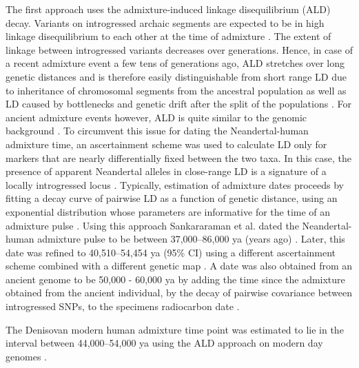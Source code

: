 \documentclass[]{article}
\begin{document}
The first approach uses the admixture-induced linkage disequilibrium (ALD) decay. Variants on introgressed archaic segments are expected to be in high linkage disequilibrium to each other at the time of admixture \citep{chakraborty_admixture_1988,stephens_mapping_1994,wall_detecting_2000}. The extent of linkage between introgressed variants decreases over generations. Hence, in case of a recent admixture event a few tens of generations ago, ALD stretches  over long genetic distances
\citep{patterson_methods_2004} and is therefore easily distinguishable from short range LD due to inheritance of chromosomal segments from the ancestral population as well as LD caused by bottlenecks and genetic drift after the split of the populations \citep{moorjani_history_2011,sankararaman_date_2012}. For ancient admixture events however, ALD is quite similar to the genomic background \citep{sankararaman_date_2012}. To circumvent this issue for dating the Neandertal-human admixture time, an ascertainment scheme was used to calculate LD only for markers that are nearly differentially fixed between the two taxa. In this case, the presence of apparent Neandertal alleles in close-range LD is a signature of a locally introgressed locus
\citep{sankararaman_date_2012}. Typically, estimation of admixture dates proceeds by fitting a decay curve of pairwise LD as a function of genetic distance, using an exponential distribution whose parameters are informative for the time of an admixture pulse \citep{moorjani_history_2011,loh_inferring_2013}. Using this approach Sankararaman et al. dated the Neandertal-human admixture pulse to be  between 37,000--86,000 ya (years ago) \citep{sankararaman_date_2012}. Later, this date was refined to 40,510--54,454 ya (95\% CI) using a different ascertainment scheme combined with a different genetic map \citep{moorjani_genetic_2016}. A date was also obtained from an ancient genome to be 50,000 - 60,000 ya by adding the time since the admixture obtained from the ancient individual, by the decay of pairwise covariance between
introgressed SNPs, to the specimens radiocarbon date \citep{fu_genome_2014}.

The Denisovan modern human admixture time point was estimated to lie in the interval between 44,000--54,000 ya using the ALD
approach on modern day genomes \citep{sankararaman_combined_2016}. 
\end{document}
